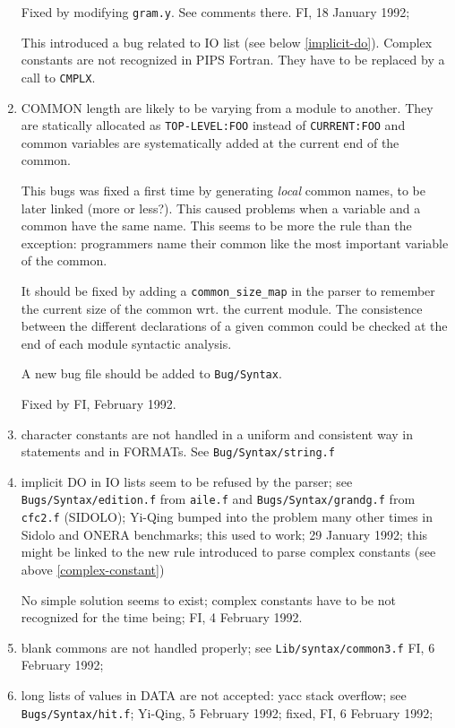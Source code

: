 \begin{enumerate}
	Fixed by modifying \verb+gram.y+. See comments there.
	FI, 18 January 1992;

	This introduced a bug related to IO list (see below
	\ref{implicit-do}). Complex
	constants are not recognized in PIPS Fortran. They have to
	be replaced by a call to \verb+CMPLX+.

  \item COMMON length are likely to be varying from a module to another.
	They are statically allocated as \verb+TOP-LEVEL:FOO+ instead
	of \verb+CURRENT:FOO+ and common variables are systematically
	added at the current end of the common.

	This bugs was fixed a first time by generating {\em local}
	common names, to be later linked (more or less?). This caused
	problems when a variable and a common have the same name. This
	seems to be more the rule than the exception: programmers
	name their common like the most important variable of the
	common.

	It should be fixed by adding a \verb+common_size_map+ in the
	parser to remember the current size of the common wrt. the
	current module. The consistence between the different
	declarations of a given common could be checked at the
	end of each module syntactic analysis.

	A new bug file should be added to \verb+Bug/Syntax+.

	Fixed by FI, February 1992.

  \item character constants are not handled in a uniform and consistent
	way in statements and in FORMATs. See \verb+Bug/Syntax/string.f+

  \item \label{implicit-do}
	implicit DO in IO lists seem to be refused by the parser; see
	\verb+Bugs/Syntax/edition.f+ from \verb+aile.f+ and
	\verb+Bugs/Syntax/grandg.f+ from \verb+cfc2.f+ (SIDOLO);
	Yi-Qing bumped into the problem many other times in Sidolo
	and ONERA benchmarks; this used to work; 29 January 1992;
	this might be linked to the new rule introduced to parse
	complex constants (see above \ref{complex-constant})

	No simple solution seems to exist; complex constants have
	to be not recognized for the time being; FI, 4 February 1992.

  \item blank commons are not handled properly; see \verb+Lib/syntax/common3.f+
	FI, 6 February 1992;

  \item long lists of values in DATA are not accepted: yacc stack overflow;
	see \verb+Bugs/Syntax/hit.f+; Yi-Qing, 5 February 1992;
	fixed, FI, 6 February 1992;


\end{enumerate}

